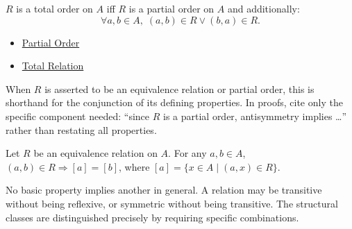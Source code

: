 \begin{remark*}
$R$ is a total order on $A$ iff $R$ is a partial order on $A$ and additionally:
\[
\forall a, b \in A,\; (a,b)\in R \vee (b,a)\in R.
\]
\end{remark*}

\begin{dependencies}
\begin{itemize}
  \item \hyperref[def:partial-order]{Partial Order}
  \item \hyperref[def:total-rel]{Total Relation}
\end{itemize}
\end{dependencies}

\begin{remark*}
When $R$ is asserted to be an equivalence relation or partial order, this is
shorthand for the conjunction of its defining properties. In proofs, cite
only the specific component needed: ``since $R$ is a partial order,
antisymmetry implies \dots'' rather than restating all properties.
\end{remark*}

\begin{example*}
Let $R$ be an equivalence relation on $A$. For any $a,b \in A$,
$(a,b) \in R \Rightarrow [a] = [b]$, where $[a] = \{x \in A \mid (a,x) \in R\}$.
\end{example*}



\begin{remark*}
No basic property implies another in general. A relation may be transitive
without being reflexive, or symmetric without being transitive. The structural
classes are distinguished precisely by requiring specific combinations.
\end{remark*}
